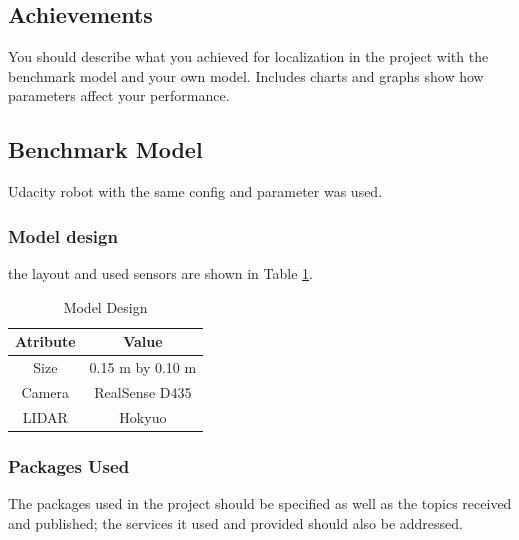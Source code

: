 \documentclass[10pt,journal,compsoc]{IEEEtran}
\begin{document}
\subsection{Achievements}
You should describe what you achieved for localization in the project with the benchmark model and your own model. Includes charts and graphs show how parameters affect your performance. 

\subsection{Benchmark Model}
Udacity robot with the same config and parameter was used.
\subsubsection{Model design}
the layout and used sensors are shown in Table \ref{table:model_design}.
\begin{table}[ht]
      \caption{Model Design}
      \label{table:model_design}
      \begin{center}
      \begin{tabular}{|c|c|}
      \hline
      Atribute & Value \\
      \hline\hline
      \hline
      Size & 0.15 m by 0.10 m \\
      \hline
      Camera & RealSense D435 \\
      \hline
      LIDAR & Hokyuo  \\
      \hline
      \end{tabular}
      \end{center}
\end{table}
\subsubsection{Packages Used}
The packages used in the project should be specified as well as the topics received and published; the services it used and provided should also be addressed. 
\end{document}
